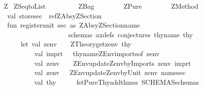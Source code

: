 %
\begin{isabellebody}%
\def\isabellecontext{Z}%
%
\isamarkuptrue%
%
\isadelimtheory
%
\endisadelimtheory
%
\isatagtheory
{}\isamarkupfalse%
\ \ Z\isanewline
{}\ ZSeqtoList\ \isanewline
\ \ \ \ \ \ \ \ ZBag\isanewline
\ \ \ \ \ \ \ \ ZPure\isanewline
\ \ \ \ \ \ \ \ ZMethod\isanewline
\isanewline
{}%
\endisatagtheory
{\isafoldtheory}%
%
\isadelimtheory
%
\endisadelimtheory
%
\isamarkuptrue%
%
\isadelimML
%
\endisadelimML
%
\isatagML
{}\isamarkupfalse%
{\isacharverbatimopen}\isanewline
\isanewline
\ \ \ val\ store{\isacharunderscore}sec\ {\isacharequal}\ ref{\isacharparenleft}ZAbsy{\isachardot}ZSection{\isacharparenleft}{\isachardoublequote}{\isachardoublequote}{\isacharcomma}{\isacharbrackleft}{\isacharbrackright}{\isacharcomma}{\isacharbrackleft}{\isacharbrackright}{\isacharparenright}{\isacharparenright}{\isacharsemicolon}\isanewline
\isanewline
\ \ \ fun\ register{\isacharunderscore}unit\ {\isacharparenleft}sec\ as\ {\isacharparenleft}ZAbsy{\isachardot}ZSection{\isacharparenleft}name{\isacharcomma}{\isacharunderscore}{\isacharcomma}{\isacharunderscore}{\isacharparenright}{\isacharparenright}{\isacharparenright}\ \isanewline
\ \ \ \ \ \ \ \ \ \ \ \ \ \ \ \ \ \ \ \ \ schemas\ axdefs\ conjectures\ thy{\isacharunderscore}name\ thy\ {\isacharequal}\ \isanewline
\ \ \ \ \ \ \ let\ val\ zenv\ \ \ {\isacharequal}\ ZTheory{\isachardot}get{\isacharunderscore}zenv\ thy\isanewline
\ \ \ \ \ \ \ \ \ \ \ val\ imprt{\isacharprime}\ \ {\isacharequal}\ {\isacharparenleft}thy{\isacharunderscore}name{\isacharcolon}{\isacharcolon}ZEnv{\isachardot}imports{\isacharunderscore}of\ zenv{\isacharparenright}\isanewline
\ \ \ \ \ \ \ \ \ \ \ val\ zenv{\isacharprime}\ \ \ {\isacharequal}\ ZEnv{\isachardot}update{\isacharunderscore}Zenv{\isacharunderscore}by{\isacharunderscore}Imports\ zenv\ imprt{\isacharprime}\isanewline
\ \ \ \ \ \ \ \ \ \ \ val\ zenv{\isacharprime}{\isacharprime}\ \ {\isacharequal}\ ZEnv{\isachardot}update{\isacharunderscore}Zenv{\isacharunderscore}by{\isacharunderscore}Unit\ zenv{\isacharprime}\ {\isacharparenleft}name{\isacharcomma}sec{\isacharparenright}\isanewline
\ \ \ \ \ \ \ \ \ \ \ val\ thy{\isacharprime}\ \ \ \ \ {\isacharequal}\ fst{\isacharparenleft}PureThy{\isachardot}add{\isacharunderscore}thmss\ {\isacharbrackleft}{\isacharparenleft}{\isacharparenleft}{\isachardoublequote}SCHEMAS{\isachardoublequote}{\isacharcomma}schemas{\isacharparenright}{\isacharcomma}{\isacharbrackleft}{\isacharbrackright}{\isacharparenright}{\isacharbrackright}\isanewline

\end{isabellebody}
